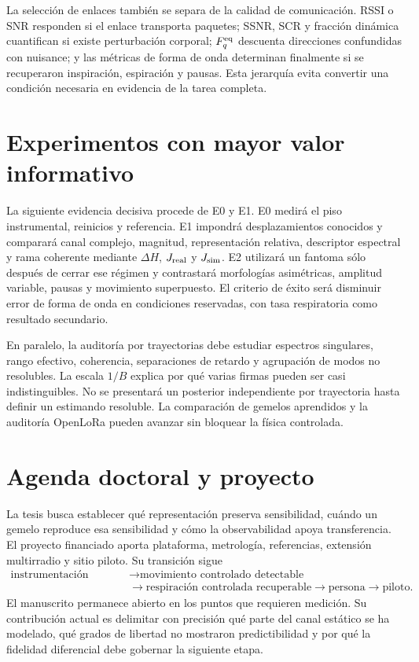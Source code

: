 La selección de enlaces también se separa de la calidad de comunicación. RSSI o
SNR responden si el enlace transporta paquetes; SSNR, SCR y fracción dinámica
cuantifican si existe perturbación corporal; $F_q^{\rm eq}$ descuenta direcciones
confundidas con nuisance; y las métricas de forma de onda determinan finalmente si
se recuperaron inspiración, espiración y pausas. Esta jerarquía evita convertir una
condición necesaria en evidencia de la tarea completa.

\section{Experimentos con mayor valor informativo}

La siguiente evidencia decisiva procede de E0 y E1. E0 medirá el piso instrumental,
reinicios y referencia. E1 impondrá desplazamientos conocidos y comparará canal
complejo, magnitud, representación relativa, descriptor espectral y rama coherente
mediante $\Delta H$, $J_{\rm real}$ y $J_{\rm sim}$. E2 utilizará un fantoma sólo
después de cerrar ese régimen y contrastará morfologías asimétricas, amplitud
variable, pausas y movimiento superpuesto. El criterio de éxito será disminuir
error de forma de onda en condiciones reservadas, con tasa respiratoria como
resultado secundario.

En paralelo, la auditoría por trayectorias debe estudiar espectros singulares, rango
efectivo, coherencia, separaciones de retardo y agrupación de modos no resolubles.
La escala $1/B$ explica por qué varias firmas pueden ser casi indistinguibles. No
se presentará un posterior independiente por trayectoria hasta definir un estimando
resoluble. La comparación de gemelos aprendidos y la auditoría OpenLoRa pueden avanzar
sin bloquear la física controlada.

\section{Agenda doctoral y proyecto}

La tesis busca establecer qué representación preserva sensibilidad, cuándo un gemelo reproduce esa sensibilidad y cómo la observabilidad apoya transferencia. El proyecto financiado aporta plataforma, metrología, referencias, extensión multirradio y sitio piloto. Su transición sigue
\[
\begin{aligned}
\text{instrumentación estable}&\rightarrow
\text{movimiento controlado detectable}\\
&\rightarrow\text{respiración controlada recuperable}
\rightarrow\text{persona}\rightarrow\text{piloto}.
\end{aligned}
\]
El manuscrito permanece abierto en los puntos que requieren medición. Su contribución actual es delimitar con precisión qué parte del canal estático se ha modelado, qué grados de libertad no mostraron predictibilidad y por qué la fidelidad diferencial debe gobernar la siguiente etapa.
